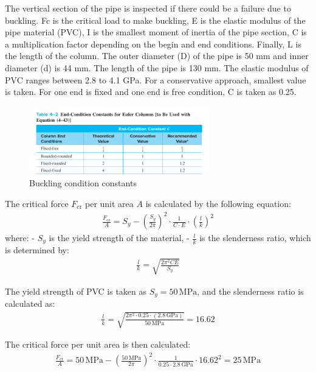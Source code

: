 \documentclass[12pt]{report}
\begin{document}
The vertical section of the pipe is inspected if there could be a failure due to buckling.
Fc is the critical load to make buckling, E is the elastic modulus of the pipe material (PVC), I is the smallest moment of inertia of the pipe section, C is a multiplication factor depending on the begin and end conditions. Finally, L is the length of the column. 
The outer diameter (D) of the pipe is 50 mm and inner diameter (d) is 44 mm. The length of the pipe is 130 mm. The elastic modulus of PVC ranges between 2.8 to 4.1 GPa. For a conservative approach, smallest value is taken. For one end is fixed and one end is free condition, C is taken as 0.25.
\begin{figure}[h]
    \centering
    \includegraphics[width=0.7\textwidth]{Figures/Figures/buckling conditions.png}
    \caption{Buckling condition constants}
    \label{fig:buckling}
\end{figure}

The critical force \( F_{\text{cr}} \) per unit area \( A \) is calculated by the following equation:
\begin{align}
\frac{F_{\text{cr}}}{A} = S_y - \left( \frac{S_y}{2\pi} \right)^2 \cdot \frac{1}{C \cdot E} \cdot \left( \frac{l}{k} \right)^2
\end{align}
where:
- \( S_y \) is the yield strength of the material,
- \( \frac{l}{k} \) is the slenderness ratio, which is determined by:
\begin{align}
\frac{l}{k} = \sqrt{\frac{2 \pi^2 C E}{S_y}}
\end{align}

The yield strength of PVC is taken as \( S_y = 50 \, \text{MPa} \), and the slenderness ratio is calculated as:
\begin{align}
\frac{l}{k} = \sqrt{\frac{2 \pi^2 \cdot 0.25 \cdot (2.8 \, \text{GPa})}{50 \, \text{MPa}}} = 16.62
\end{align}

The critical force per unit area is then calculated:
\begin{align}
\frac{F_{\text{cr}}}{A} = 50 \, \text{MPa} - \left( \frac{50 \, \text{MPa}}{2\pi} \right)^2 \cdot \frac{1}{0.25 \cdot 2.8 \, \text{GPa}} \cdot 16.62^2 = 25 \, \text{MPa}
\end{align}
\end{document}
